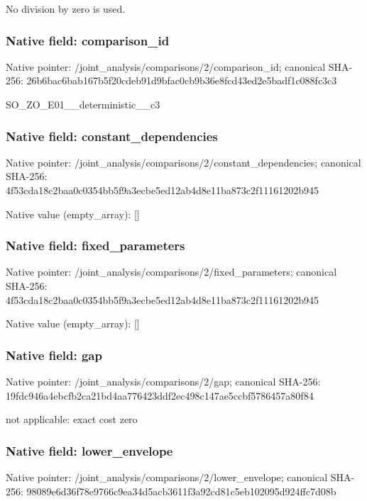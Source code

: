 \documentclass[10pt,a4paper]{article}
\begin{document}
\begingroup\raggedright\sloppy No division by zero is used.\par\endgroup

\subsubsection{Native field: comparison\_\allowbreak{}id}
Native pointer: /joint\_\allowbreak{}analysis/comparisons/2/comparison\_\allowbreak{}id; canonical SHA-256: 26b6bac6bab167b5f20cdeb91d9bfac0cb9b36e8fcd43ed2e5badf1c088fc3c3

\begingroup\raggedright\sloppy SO\_\allowbreak{}ZO\_\allowbreak{}E01\_\allowbreak{}\_\allowbreak{}deterministic\_\allowbreak{}\_\allowbreak{}c3\par\endgroup

\subsubsection{Native field: constant\_\allowbreak{}dependencies}
Native pointer: /joint\_\allowbreak{}analysis/comparisons/2/constant\_\allowbreak{}dependencies; canonical SHA-256: 4f53cda18c2baa0c0354bb5f9a3ecbe5ed12ab4d8e11ba873c2f11161202b945

Native value (empty\_\allowbreak{}array): []

\subsubsection{Native field: fixed\_\allowbreak{}parameters}
Native pointer: /joint\_\allowbreak{}analysis/comparisons/2/fixed\_\allowbreak{}parameters; canonical SHA-256: 4f53cda18c2baa0c0354bb5f9a3ecbe5ed12ab4d8e11ba873c2f11161202b945

Native value (empty\_\allowbreak{}array): []

\subsubsection{Native field: gap}
Native pointer: /joint\_\allowbreak{}analysis/comparisons/2/gap; canonical SHA-256: 19fdc946a4ebcfb2ca21bd4aa776423ddf2ec498c147ae5ccbf5786457a80f84

\begingroup\raggedright\sloppy not applicable:\allowbreak{} exact cost zero\par\endgroup

\subsubsection{Native field: lower\_\allowbreak{}envelope}
Native pointer: /joint\_\allowbreak{}analysis/comparisons/2/lower\_\allowbreak{}envelope; canonical SHA-256: 98089e6d36f78e9766c9ea34d5acb3611f3a92cd81c5eb102095d924ffc7d08b
\end{document}

